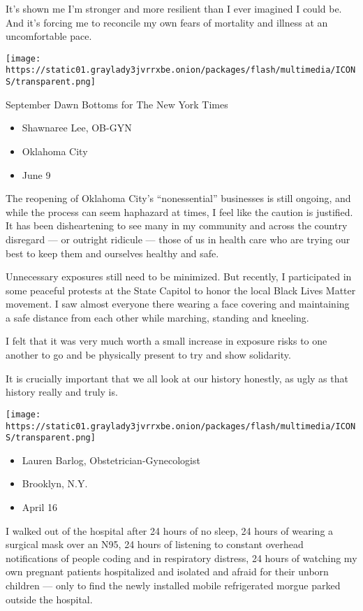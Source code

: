 It's shown me I'm stronger and more resilient than I ever imagined I
could be. And it's forcing me to reconcile my own fears of mortality and
illness at an uncomfortable pace.

\texttt{[image: https://static01.graylady3jvrrxbe.onion/packages/flash/multimedia/ICONS/transparent.png]}

September Dawn Bottoms for The New York Times

\begin{itemize}
\tightlist
\item
  Shawnaree Lee, OB-GYN
\item
  Oklahoma City
\item
  June 9
\end{itemize}

The reopening of Oklahoma City's ``nonessential'' businesses is still
ongoing, and while the process can seem haphazard at times, I feel like
the caution is justified. It has been disheartening to see many in my
community and across the country disregard --- or outright ridicule ---
those of us in health care who are trying our best to keep them and
ourselves healthy and safe.

Unnecessary exposures still need to be minimized. But recently, I
participated in some peaceful protests at the State Capitol to honor the
local Black Lives Matter movement. I saw almost everyone there wearing a
face covering and maintaining a safe distance from each other while
marching, standing and kneeling.

I felt that it was very much worth a small increase in exposure risks to
one another to go and be physically present to try and show solidarity.

It is crucially important that we all look at our history honestly, as
ugly as that history really and truly is.

\texttt{[image: https://static01.graylady3jvrrxbe.onion/packages/flash/multimedia/ICONS/transparent.png]}

\begin{itemize}
\tightlist
\item
  Lauren Barlog, Obstetrician-Gynecologist
\item
  Brooklyn, N.Y.
\item
  April 16
\end{itemize}

I walked out of the hospital after 24 hours of no sleep, 24 hours of
wearing a surgical mask over an N95, 24 hours of listening to constant
overhead notifications of people coding and in respiratory distress, 24
hours of watching my own pregnant patients hospitalized and isolated and
afraid for their unborn children --- only to find the newly installed
mobile refrigerated morgue parked outside the hospital.

